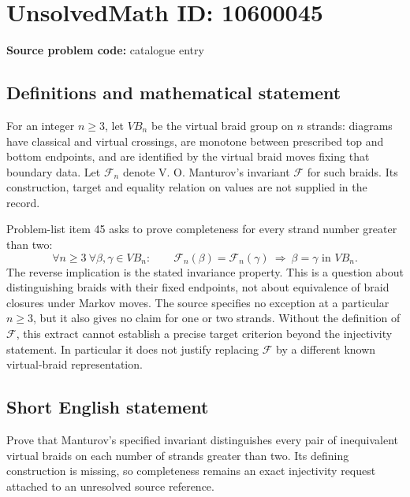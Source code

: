 \documentclass[11pt]{article}
\begin{document}
\section*{UnsolvedMath ID: 10600045}
\textbf{Source problem code:} catalogue entry
\subsection{Definitions and mathematical statement}
For an integer \(n\ge3\), let \(VB_n\) be the virtual braid group on \(n\) strands: diagrams have classical and virtual crossings, are monotone between prescribed top and bottom endpoints, and are identified by the virtual braid moves fixing that boundary data. Let \(\mathcal F_n\) denote V. O. Manturov's invariant \(\mathcal F\) for such braids. Its construction, target and equality relation on values are not supplied in the record.

Problem-list item 45 asks to prove completeness for every strand number greater than two:
\[
 \forall n\ge3\ \forall\beta,\gamma\in VB_n:\qquad
 \mathcal F_n(\beta)=\mathcal F_n(\gamma)
 \ \Longrightarrow\ \beta=\gamma\text{ in }VB_n.
\]
The reverse implication is the stated invariance property. This is a question about distinguishing braids with their fixed endpoints, not about equivalence of braid closures under Markov moves. The source specifies no exception at a particular \(n\ge3\), but it also gives no claim for one or two strands. Without the definition of \(\mathcal F\), this extract cannot establish a precise target criterion beyond the injectivity statement. In particular it does not justify replacing \(\mathcal F\) by a different known virtual-braid representation.
\subsection{Short English statement}
Prove that Manturov's specified invariant distinguishes every pair of inequivalent virtual braids on each number of strands greater than two. Its defining construction is missing, so completeness remains an exact injectivity request attached to an unresolved source reference.
\end{document}

